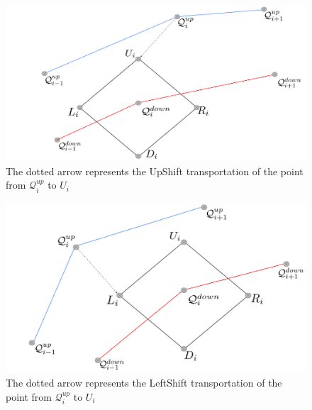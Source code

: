 \documentclass{article}
\newtheorem{theorem}{Theorem}[section]
\begin{document}
\begin{figure}[!h]
    \centering
    \includegraphics[scale = 0.35]{diagrams/Upshift_updated.png}
    \caption{The dotted arrow represents the UpShift transportation of the point from $\mathcal{Q}_i^{up}$ to $U_i$}
    \label{fig:Upsh}
\end{figure}
\begin{figure}[!h]
    \centering
    \includegraphics[scale = 0.4]{diagrams/Leftshift_updated.png}
    \caption{The dotted arrow represents the LeftShift transportation of the point from $\mathcal{Q}_i^{up}$ to $U_i$}
    \label{fig:lesh}
\end{figure}
\end{document}
